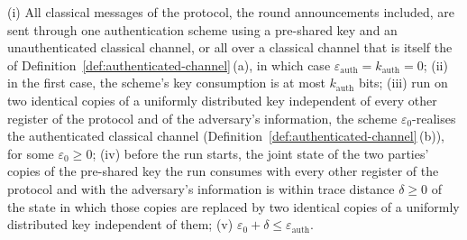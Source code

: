 \begin{assumption}\label{ass:auth}
(i) All classical messages of the protocol, the round announcements
included, are sent through one authentication scheme using a pre-shared key
and an unauthenticated classical channel, or all over a classical channel
that is itself the  of
Definition~\ref{def:authenticated-channel}\,(a), in which case
$\varepsilon_{\mathrm{auth}}=k_{\mathrm{auth}}=0$;
(ii) in the first case, the scheme's key consumption is at most
$k_{\mathrm{auth}}$ bits;
(iii) run on two identical copies of a uniformly distributed key independent
of every other register of the protocol and of the adversary's information,
the scheme $\varepsilon_0$-realises the authenticated classical channel
(Definition~\ref{def:authenticated-channel}\,(b)), for some
$\varepsilon_0\ge0$;
(iv) before the run starts, the joint state of the two parties' copies of
the pre-shared key the run consumes with every other register of the
protocol and with the adversary's information is within trace distance
$\delta\ge0$ of the state in which those copies are replaced by two
identical copies of a uniformly distributed key independent of them;
(v) $\varepsilon_0+\delta\le\varepsilon_{\mathrm{auth}}$.
\end{assumption}
